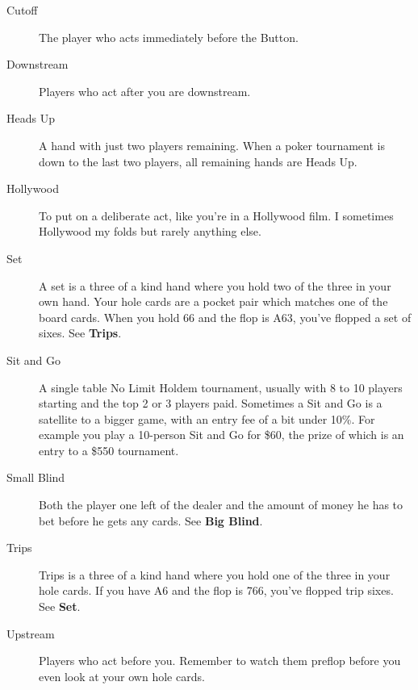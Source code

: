 \begin{description}
\item[Cutoff] The player who acts immediately before the Button.

\item[Downstream] Players who act after you are downstream.

\item[Heads Up] A hand with just two players remaining. When a poker tournament
is down to the last two players, all remaining hands are Heads Up.

\item[Hollywood] To put on a deliberate act, like you're in a Hollywood film. I
sometimes Hollywood my folds but rarely anything else.

\item[Set] A set is a three of a kind hand where you hold two of the three in your
own hand. Your hole cards are a pocket pair which matches one of the board cards.
When you hold 66 and the flop is A63, you've flopped a set of sixes. See \textbf{Trips}.

\item[Sit and Go] A single table No Limit Holdem tournament, usually with 8 to 10
players starting and the top 2 or 3 players paid. Sometimes a Sit and Go is
a satellite to a bigger game, with an entry fee of a bit under 10\%. For
example you play a 10-person Sit and Go for \$60, the prize of which
is an entry to a \$550 tournament.

\item[Small Blind] Both the player one left of the dealer and the amount of money he
has to bet before he gets any cards. See \textbf{Big Blind}.

\item[Trips] Trips is a three of a kind hand where you hold one of the three in your
hole cards. If you have A6 and the flop is 766, you've flopped trip sixes. See \textbf{Set}.

\item[Upstream] Players who act before you. Remember to watch them preflop before
you even look at your own hole cards.

\end{description}
